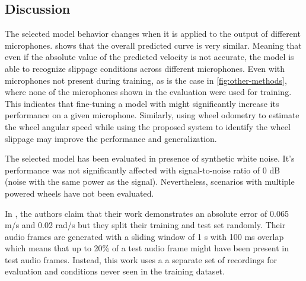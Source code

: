 \subsection{Discussion} \label{subsec:discussion}

\balance

The selected model behavior changes when it is applied to the output of
different microphones.  shows that the overall predicted
curve is very similar. Meaning that even if the absolute value of the predicted
velocity is not accurate, the model is able to recognize slippage conditions
across different microphones. Even with microphones not present during
training, as is the case in \cref{fig:other-methods}, where none of the
microphones shown in the evaluation were used for training. This indicates that
fine-tuning \cite{TL2016} a model with might significantly increase its
performance on a given microphone. Similarly, using wheel odometry to estimate
the wheel angular speed while using the proposed system to identify the wheel
slippage may improve the performance and generalization.



The selected model has been evaluated in presence of synthetic white noise.
It's performance was not significantly affected with signal-to-noise ratio of 0
dB (noise with the same power as the signal). Nevertheless, scenarios with
multiple powered wheels have not been evaluated. 


In  \cite{marchegiani2018a}, the authors claim that
their work demonstrates an absolute error of 0.065 m/s and 0.02 rad/s but they
split their training and test set randomly. Their audio frames are generated
with a sliding window of 1 s with 100 ms overlap which means that up to 20\% of
a test audio frame might have been present in test audio frames. Instead, this
work uses a a separate set of recordings for evaluation and conditions never
seen in the training dataset.

